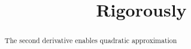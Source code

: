 \documentclass{ximera}
\title{Rigorously}
\begin{document}
	\begin{abstract}
		The second derivative enables quadratic approximation
	\end{abstract}
\end{document}
